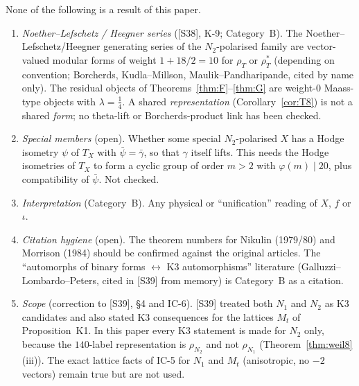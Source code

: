 
\begin{remark}\label{rem:open8}
None of the following is a result of this paper.
\begin{enumerate}[label=(\alph*)]
\item \emph{Noether--Lefschetz / Heegner series} ([S38], K-9; Category~B). The Noether--Lefschetz/Heegner generating series of the $N_2$-polarised family are vector-valued modular forms of weight $1+18/2=10$ for $\rho_T$ or $\rho_T^*$ (depending on convention; Borcherds, Kudla--Millson, Maulik--Pandharipande, cited by name only). The residual objects of Theorems~\ref{thm:F}--\ref{thm:G} are weight-$0$ Maass-type objects with $\lambda=\tfrac14$. A shared \emph{representation} (Corollary~\ref{cor:T8}) is not a shared \emph{form}; no theta-lift or Borcherds-product link has been checked.
\item \emph{Special members} (open). Whether some special $N_2$-polarised $X$ has a Hodge isometry $\psi$ of $T_X$ with $\bar\psi=\bar\gamma$, so that $\gamma$ itself lifts. This needs the Hodge isometries of $T_X$ to form a cyclic group of order $m>2$ with $\varphi(m)\mid20$, plus compatibility of $\bar\psi$. Not checked.
\item \emph{Interpretation} (Category~B). Any physical or ``unification'' reading of $X$, $f$ or $\iota$.
\item \emph{Citation hygiene} (open). The theorem numbers for Nikulin (1979/80) and Morrison (1984) should be confirmed against the original articles. The ``automorphs of binary forms $\leftrightarrow$ K3 automorphisms'' literature (Galluzzi--Lombardo--Peters, cited in [S39] from memory) is Category~B as a citation.
\item \emph{Scope} (correction to [S39], \S4 and IC-6). [S39] treated both $N_1$ and $N_2$ as K3 candidates and also stated K3 consequences for the lattices $M_t$ of Proposition~K1. In this paper every K3 statement is made for $N_2$ only, because the $140$-label representation is $\rho_{N_2}$ and not $\rho_{N_1}$ (Theorem~\ref{thm:weil8}(iii)). The exact lattice facts of IC-5 for $N_1$ and $M_t$ (anisotropic, no $-2$ vectors) remain true but are not used.
\end{enumerate}
\end{remark}

